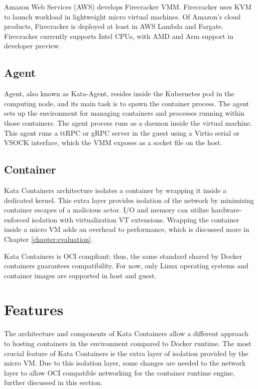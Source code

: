 Amazon Web Services (AWS) develops Firecracker VMM. Firecracker uses KVM to launch workload in lightweight micro virtual machines. Of Amazon's cloud products, Firecracker is deployed at least in AWS Lambda and Fargate. Firecracker currently supports Intel CPUs, with AMD and Arm support in developer preview. \cite{AWS}\cite{FirecrackerDesign}\cite{Debab2021}

\subsection{Agent}

Agent, also known as Kata-Agent, resides inside the Kubernetes pod in the computing node, and its main task is to spawn the container process. The agent sets up the environment for managing containers and processes running within those containers. The agent process runs as a daemon inside the virtual machine. This agent runs a ttRPC or gRPC server in the guest using a Virtio serial or VSOCK interface, which the VMM exposes as a socket file on the host. \cite{KataContainersArchitecture}

\subsection{Container}

Kata Containers architecture isolates a container by wrapping it inside a dedicated kernel. This extra layer provides isolation of the network by minimizing container escapes of a malicious actor. I/O and memory can utilize hardware-enforced isolation with virtualization VT extensions. Wrapping the container inside a micro VM adds an overhead to performance, which is discussed more in Chapter \ref{chapter:evaluation}. \cite{KataContainers}

Kata Containers is OCI compliant; thus, the same standard shared by Docker containers guarantees compatibility. For now, only Linux operating systems and container images are supported in host and guest.

\section{Features}

The architecture and components of Kata Containers allow a different approach to hosting containers in the environment compared to Docker runtime. The most crucial feature of Kata Containers is the extra layer of isolation provided by the micro VM. Due to this isolation layer, some changes are needed to the network layer to allow OCI compatible networking for the container runtime engine, further discussed in this section.

